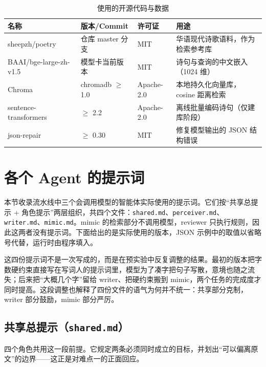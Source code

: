 \documentclass[12pt, a4paper]{ctexart}
\numberwithin{table}{section}
\numberwithin{figure}{section}
\begin{document}
\begin{table}[htbp]
  \centering
  \caption{使用的开源代码与数据}
  \label{tab:opensource}
  \begin{tabular}{p{}p{}p{}p{}}
    \toprule
    名称 & 版本/Commit & 许可证 & 用途 \\
    \midrule
    sheepzh/poetry & 仓库 master 分支 & MIT & 华语现代诗歌语料，作为检索参考库 \\
    BAAI/bge-large-zh-v1.5 & 模型卡当前版本 & MIT & 诗句与查询的中文嵌入（1024 维） \\
    Chroma & chromadb $\ge$ 1.0 & Apache-2.0 & 本地持久化向量库，cosine 距离检索 \\
    sentence-transformers & $\ge$ 2.2 & Apache-2.0 & 离线批量编码诗句（仅建库阶段） \\
    json-repair & $\ge$ 0.30 & MIT & 修复模型输出的 JSON 结构错误 \\
    \bottomrule
  \end{tabular}
\end{table}

\section{各个 Agent 的提示词}

本节收录流水线中三个会调用模型的智能体实际使用的提示词。它们按“共享总提示 + 角色提示”两层组织，共四个文件：\texttt{shared.md}、\texttt{perceiver.md}、\texttt{writer.md}、\texttt{mimic.md}。mimic 的检索部分不调用模型，reviewer 只执行规则，因此这两者没有提示词。下面给出的是实际使用的版本，JSON 示例中的取值以省略号代替，运行时由程序填入。

这四份提示词不是一次写成的，而是在预实验中反复调整的结果。最初的版本把字数硬约束直接写在写词人的提示词里，模型为了凑字把句子写散，意境也随之流失；后来把“大概几个字”留给 writer、把硬约束搬到 mimic，两个任务的完成度才同时提高。这段调整也解释了四份文件的语气为何并不统一：共享部分克制，writer 部分鼓励，mimic 部分严厉。

\subsection{共享总提示（\texttt{shared.md}）}
四个角色共用这一段前提。它规定两条必须同时成立的目标，并划出“可以偏离原文”的边界——这正是对难点一的正面回应。
\end{document}
